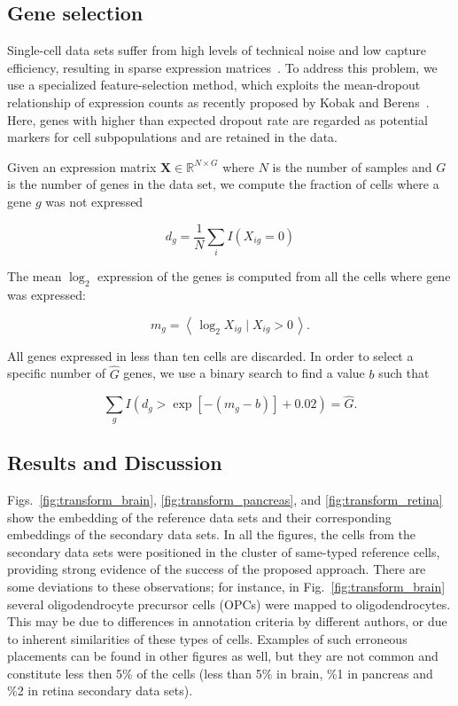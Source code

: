 \documentclass[runningheads]{llncs}
\begin{document}
\subsection{Gene selection\label{sec:gene-selection}}

Single-cell data sets suffer from high levels of technical noise and low
capture efficiency, resulting in sparse expression matrices~\cite{umi}. To
address this problem, we use a specialized feature-selection method, which
exploits the mean-dropout relationship of expression counts as recently
proposed by Kobak and Berens~\cite{art_of_using_tsne}. Here, genes with higher
than expected dropout rate are regarded as potential markers for cell
subpopulations and are retained in the data.

Given an expression matrix $\mathbf{X} \in \mathbb{R}^{N \times G}$ where $N$
is the number of samples and $G$ is the number of genes in the data set, we
compute the fraction of cells where a gene $g$ was not expressed

\begin{equation}
d_g = \frac{1}{N} \sum_i I \left ( X_{ig} = 0\right )
\end{equation}

\noindent The mean $\log_2$ expression of the genes is computed from all the
cells where gene was expressed:

\begin{equation}
m_g = \left \langle \, \log_2 X_{ig} \mid X_{ig} > 0 \, \right \rangle.
\end{equation}

All genes expressed in less than ten cells are discarded. In order to select a
specific number of $\hat{G}$ genes, we use a binary search to find a value $b$
such that

\begin{equation}
\sum_g I \left (d_g > \exp \left [ -(m_g - b) \right ] + 0.02 \right ) = \hat{G}.
\end{equation}

\subsection{Results and Discussion}

Figs.~\ref{fig:transform_brain}, \ref{fig:transform_pancreas}, and
\ref{fig:transform_retina} show the embedding of the reference data sets and
their corresponding embeddings of the secondary data sets. In all the figures,
the cells from the secondary data sets were positioned in the cluster of
same-typed reference cells, providing strong evidence of the success of the
proposed approach. There are some deviations to these observations; for
instance, in Fig.~\ref{fig:transform_brain} several oligodendrocyte precursor
cells (OPCs) were mapped to oligodendrocytes. This may be due to differences in
annotation criteria by different authors, or due to inherent similarities of
these types of cells. Examples of such erroneous placements can be found in
other figures as well, but they are not common and constitute less then 5\% of
the cells (less than  5\% in brain, \%1 in pancreas and \%2 in retina
secondary data sets).
\end{document}
